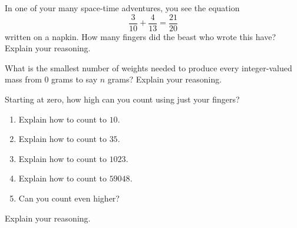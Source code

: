 \documentclass[nooutcomes]{ximera}
\begin{document}
\begin{problem}In one of your many space-time adventures, you see the equation
\[
\frac{3}{10} + \frac{4}{13} = \frac{21}{20}
\]
written on a napkin. How many fingers did the beast who wrote this
have? Explain your reasoning.
\end{problem} 

\begin{problem}What is the smallest number of weights needed to produce every
  integer-valued mass from $0$ grams to say $n$ grams? Explain your
  reasoning.
\end{problem} 

\begin{problem}Starting at zero, how high can you count using just your
  fingers?
\begin{enumerate}
\item Explain how to count to $10$.
\item Explain how to count to $35$.
\item Explain how to count to $1023$.
\item Explain how to count to $59048$.
\item Can you count even higher?
\end{enumerate}
Explain your reasoning.

\end{problem}
\end{document}
